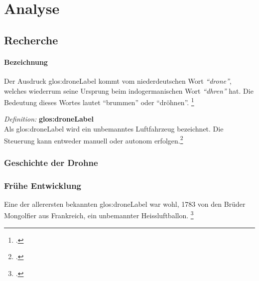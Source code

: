 \chapter{Analyse}

\section{Recherche}

\subsubsection{Bezeichnung}
Der Ausdruck \gls{glos:droneLabel} kommt vom niederdeutschen Wort \textit{"`drone"'}, welches wiederrum seine Ursprung beim indogermanischen Wort \textit{"`dhren"'} hat. Die Bedeutung dieses Wortes lautet "`brummen"' oder "`dröhnen"'. \footcite{Geschichte_der_Drohne_-_Nachrichten_Print_-_DIE_WELT_-_Wissen_Print_DW_-_DIE_WELT_2015-03-21}

\begin{framed}
	\textit{Definition: }\textbf{\gls{glos:droneLabel}}\\
	Als \gls{glos:droneLabel} wird ein unbemanntes Luftfahrzeug bezeichnet. Die Steuerung kann entweder manuell oder autonom erfolgen.\footcite{Drone_Define_Drone_at_Dictionary.com_2015-03-21}
\end{framed}

\subsection{Geschichte der Drohne}

\subsection{Frühe Entwicklung}
Eine der allerersten bekannten \gls{glos:droneLabel} war wohl, 1783 von den Brüder Mongolfier aus Frankreich, ein unbemannter Heissluftballon. \footcite{Kleine_Geschichte_der_Drohnen_-_Nachrichten_Print_-_WELT_KOMPAKT_-_Lifestyle_-_DIE_WELT_2015-03-21}

